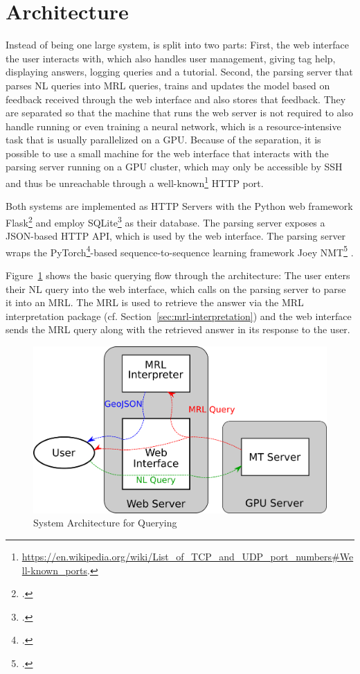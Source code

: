 \section{Architecture}

Instead of being one large system, \nlmapsweb{} is split into two parts: First,
the web interface the user interacts with, which also handles user management,
giving tag help, displaying answers, logging queries and a tutorial. Second, the
parsing server that parses NL queries into MRL queries, trains and updates the
model based on feedback received through the web interface and also stores that
feedback. They are separated so that the machine that runs the web server is not
required to also handle running or even training a neural network, which is a
resource-intensive task that is usually parallelized on a GPU. Because of the
separation, it is possible to use a small machine for the web interface that
interacts with the parsing server running on a GPU cluster, which may only be
accessible by SSH and thus be unreachable through a
well-known\footnote{\url{https://en.wikipedia.org/wiki/List_of_TCP_and_UDP_port_numbers\#Well-known_ports}.}
HTTP port.

Both systems are implemented as HTTP Servers with the Python web framework
Flask\footcite{flask} and employ SQLite\footcite{sqlite} as their database. The
parsing server exposes a JSON-based HTTP API, which is used by the web
interface. The parsing server wraps the PyTorch\footcite{pytorch}-based
sequence-to-sequence learning framework Joey NMT\footcite{joeynmt}
\parencite{kreutzer-2019}.

Figure~\ref{fig:querying-architecture} shows the basic querying flow through the
architecture: The user enters their NL query into the web interface, which calls
on the parsing server to parse it into an MRL. The MRL is used to retrieve the
answer via the MRL interpretation package (cf.
Section~\ref{sec:mrl-interpretation}) and the web interface sends the MRL query
along with the retrieved answer in its response to the user.

\begin{figure}[h]
  \centering
  \includegraphics[width=\textwidth]{fig/querying_architecture.png}
  \caption[Querying Architecture]{System Architecture for Querying}
  \label{fig:querying-architecture}
\end{figure}

